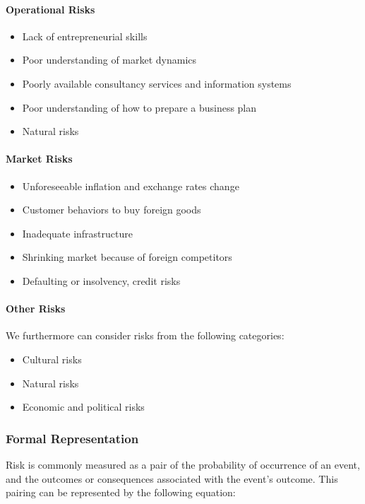 \documentclass[a4paper]{extarticle}
\begin{document}
\paragraph{Operational Risks}

\begin{itemize}
    \item Lack of entrepreneurial skills
    \item Poor understanding of market dynamics
    \item Poorly available consultancy services and information systems
    \item Poor understanding of how to prepare a business plan
    \item Natural risks
\end{itemize}

\paragraph{Market Risks}

\begin{itemize}
    \item Unforeseeable inflation and exchange rates change
    \item Customer behaviors to buy foreign goods
    \item Inadequate infrastructure
    \item Shrinking market because of foreign competitors
    \item Defaulting or insolvency, credit risks
\end{itemize}

\paragraph{Other Risks}

We furthermore can consider risks from the following categories:

\begin{itemize}
    \item Cultural risks
    \item Natural risks
    \item Economic and political risks
\end{itemize}

\subsubsection{Formal Representation}

Risk is commonly measured as a pair of the probability of occurrence of an event, and the outcomes or consequences associated with the event's outcome. This pairing can be represented by the following equation:
\end{document}
